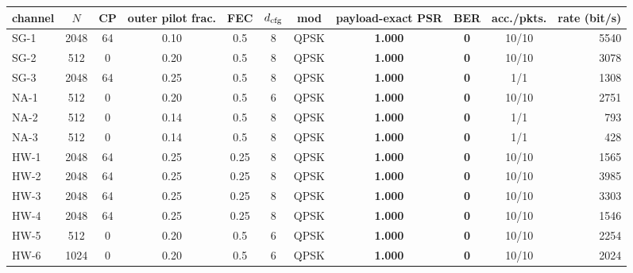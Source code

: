 \begin{tabular}{lcccccc>{\bfseries}c>{\bfseries}c c r}
\toprule
channel & $N$ & CP & outer pilot frac. & FEC & $d_{\rm cfg}$ & mod & payload-exact PSR & BER & acc./pkts. & rate (bit/s) \\
\midrule
SG-1 & 2048 & 64 & 0.10 & 0.5 & 8 & QPSK & 1.000 & 0 & 10/10 & 5540 \\
SG-2 & 512 & 0 & 0.20 & 0.5 & 8 & QPSK & 1.000 & 0 & 10/10 & 3078 \\
SG-3 & 2048 & 64 & 0.25 & 0.5 & 8 & QPSK & 1.000 & 0 & 1/1 & 1308 \\
NA-1 & 512 & 0 & 0.20 & 0.5 & 6 & QPSK & 1.000 & 0 & 10/10 & 2751 \\
NA-2 & 512 & 0 & 0.14 & 0.5 & 8 & QPSK & 1.000 & 0 & 1/1 & 793 \\
NA-3 & 512 & 0 & 0.14 & 0.5 & 8 & QPSK & 1.000 & 0 & 1/1 & 428 \\
HW-1 & 2048 & 64 & 0.25 & 0.25 & 8 & QPSK & 1.000 & 0 & 10/10 & 1565 \\
HW-2 & 2048 & 64 & 0.25 & 0.25 & 8 & QPSK & 1.000 & 0 & 10/10 & 3985 \\
HW-3 & 2048 & 64 & 0.25 & 0.25 & 8 & QPSK & 1.000 & 0 & 10/10 & 3303 \\
HW-4 & 2048 & 64 & 0.25 & 0.25 & 8 & QPSK & 1.000 & 0 & 10/10 & 1546 \\
HW-5 & 512 & 0 & 0.20 & 0.5 & 6 & QPSK & 1.000 & 0 & 10/10 & 2254 \\
HW-6 & 1024 & 0 & 0.20 & 0.5 & 6 & QPSK & 1.000 & 0 & 10/10 & 2024 \\
\bottomrule
\end{tabular}
